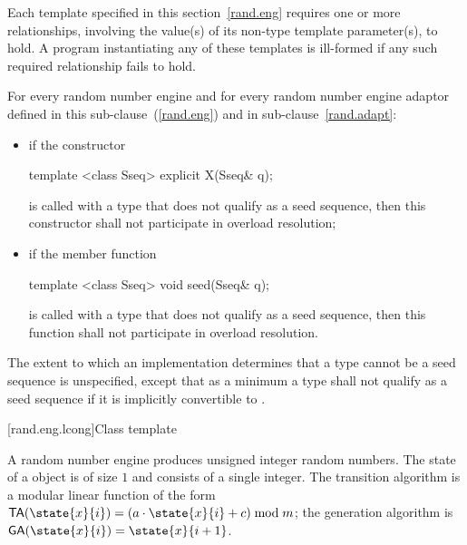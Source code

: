 \pnum
Each template specified in this section~\ref{rand.eng}
requires one or more relationships,
involving the value(s) of its non-type template parameter(s), to hold.
A program instantiating any of these templates
is ill-formed
if any such required relationship fails to hold.

\pnum
For every random number engine and for every random number engine adaptor 
defined in this sub-clause~(\ref{rand.eng}) and in sub-clause~\ref{rand.adapt}:

\begin{itemize}
\item
if the constructor
\begin{codeblock}
template <class Sseq> explicit X(Sseq& q);
\end{codeblock}
is called with a type  that does not qualify as a seed sequence, then this
constructor shall not participate in overload resolution;

\item
if the member function
\begin{codeblock}
template <class Sseq> void seed(Sseq& q);
\end{codeblock}
is called with a type  that does not qualify as a seed sequence, then this
function shall not participate in overload resolution.
\end{itemize}

The extent to which an implementation determines that a type cannot be a seed sequence
is unspecified, except that as a minimum a type shall not qualify as a seed sequence
if it is implicitly convertible to .


[rand.eng.lcong]{Class template }%
%

\pnum
A  random number engine
produces unsigned integer random numbers.
The state%
of a  object 
is of size $1$
and consists of a single integer.
The transition algorithm%
%
is a modular linear function of the form
$\mathsf{TA}(\state{x}{i}) = (a \cdot \state{x}{i} + c) \bmod m$;
the generation algorithm%
%
is $ \mathsf{GA}(\state{x}{i}) = \state{x}{i+1} $.

